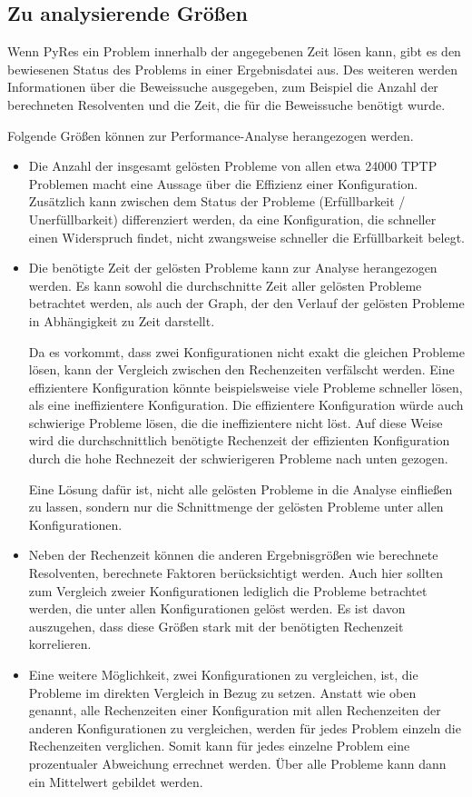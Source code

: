 	
	\subsection{Zu analysierende Größen}
	
	Wenn PyRes ein Problem innerhalb der angegebenen Zeit lösen kann, gibt es den bewiesenen Status des Problems in einer Ergebnisdatei aus. Des weiteren werden Informationen über die Beweissuche ausgegeben, zum Beispiel die Anzahl der berechneten Resolventen und die Zeit, die für die Beweissuche benötigt wurde.
	
	Folgende Größen können zur Performance-Analyse herangezogen werden.
	\begin{itemize}
		\item Die Anzahl der insgesamt gelösten Probleme von allen etwa 24000 TPTP Problemen macht eine Aussage über die Effizienz einer Konfiguration. Zusätzlich kann zwischen dem Status der Probleme (Erfüllbarkeit / Unerfüllbarkeit) differenziert werden, da eine Konfiguration, die schneller einen Widerspruch findet, nicht zwangsweise schneller die Erfüllbarkeit belegt.
		
		\item Die benötigte Zeit der gelösten Probleme kann zur Analyse herangezogen werden. Es kann sowohl die durchschnitte Zeit aller gelösten Probleme betrachtet werden, als auch der Graph, der den Verlauf der gelösten Probleme in Abhängigkeit zu Zeit darstellt.
		
		Da es vorkommt, dass zwei Konfigurationen nicht exakt die gleichen Probleme lösen, kann der Vergleich zwischen den Rechenzeiten verfälscht werden. Eine effizientere Konfiguration könnte beispielsweise viele Probleme schneller lösen, als eine ineffizientere Konfiguration. Die effizientere Konfiguration würde auch schwierige Probleme lösen, die die ineffizientere nicht löst. Auf diese Weise wird die durchschnittlich benötigte Rechenzeit der effizienten Konfiguration durch die hohe Rechnezeit der schwierigeren Probleme nach unten gezogen.
		
		Eine Lösung dafür ist, nicht alle gelösten Probleme in die Analyse einfließen zu lassen, sondern nur die Schnittmenge der gelösten Probleme unter allen Konfigurationen.
		
		\item Neben der Rechenzeit können die anderen Ergebnisgrößen wie berechnete Resolventen, berechnete Faktoren berücksichtigt werden. Auch hier sollten zum Vergleich zweier Konfigurationen lediglich die Probleme betrachtet werden, die unter allen Konfigurationen gelöst werden. Es ist davon auszugehen, dass diese Größen stark mit der benötigten Rechenzeit korrelieren.
		
		\item Eine weitere Möglichkeit, zwei Konfigurationen zu vergleichen, ist, die Probleme im direkten Vergleich in Bezug zu setzen. Anstatt wie oben genannt, alle Rechenzeiten einer Konfiguration mit allen Rechenzeiten der anderen Konfigurationen zu vergleichen, werden für jedes Problem einzeln die Rechenzeiten verglichen. Somit kann für jedes einzelne Problem eine prozentualer Abweichung errechnet werden. Über alle Probleme kann dann ein Mittelwert gebildet werden. 
	\end{itemize}
